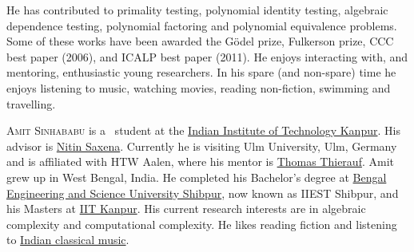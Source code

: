 \documentclass{toc}
\begin{document}
\begin{tocaboutauthors}
\begin{tocabout}[saxena]
\noindent
He has contributed to primality testing, polynomial identity testing, algebraic dependence testing, polynomial factoring and polynomial equivalence problems. Some of these works have been awarded the G\"odel prize, Fulkerson prize, CCC best paper (2006), and ICALP best paper (2011). He enjoys interacting with,
%
and   %
mentoring, enthusiastic young researchers. In his spare
%
(and non-spare)   %
time he enjoys listening to music, watching movies, reading non-fiction, swimming and travelling. 
\end{tocabout}
\begin{tocabout}[sinhababu]
\textsc{Amit Sinhababu} is a \phd\ student
%
at the   %
\href{http://www.iitk.ac.in}{Indian Institute of Technology Kanpur}.
%
%
%
%
%
%
%
%
His advisor is \href{https://www.cse.iitk.ac.in/users/nitin/}{Nitin Saxena}. 
Currently he is 
%
%
%
%
visiting Ulm University, Ulm, Germany %
and is affiliated with HTW Aalen,  %
where his mentor is 
\href{https://image.informatik.htw-aalen.de/Thierauf/}{Thomas Thierauf}. %
Amit grew up in West Bengal, India. He completed his Bachelor's degree at \href{http://www.iiests.ac.in/}{Bengal Engineering and Science University 
%
Shibpur}, now known as IIEST Shibpur, and    %
his  %
Masters at \href{https://www.iitk.ac.in/}{IIT Kanpur}. His current 
research interests are in algebraic complexity and computational complexity. 
He likes reading fiction and listening to 
\href{https://www.parrikar.org/}{Indian classical music}. %
\end{tocabout}
\end{tocaboutauthors}
\end{document}
